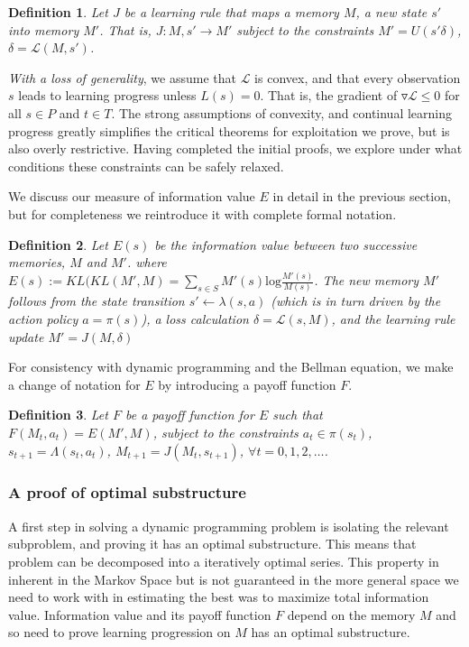 \documentclass[9pt,twocolumn,twoside]{pnas-new}
\newtheorem{definition}{Definition}
\begin{document}
\begin{definition}
    Let $J$ be a learning rule that maps a memory $M$, a new state $s'$ into memory $M'$. That is, $J : M, s' \rightarrow M'$ subject to the constraints  $M' = U(s' \delta)$, $\delta = \mathcal{L}(M, s')$.
\end{definition}

\textit{With a loss of generality}, we assume that $\mathcal{L}$ is convex, and that every observation $s$ leads to learning progress unless $L(s) = 0$. That is, the gradient of $\triangledown \mathcal{L} \leq 0$ for all $s \in P$ and $t \in T$. The strong assumptions of convexity, and continual learning progress greatly simplifies the critical theorems for exploitation we prove, but is also overly restrictive. Having completed the initial proofs, we explore under what conditions these constraints can be safely relaxed.

We discuss our measure of information value $E$ in detail in the previous section, but for completeness we reintroduce it with complete formal notation.

\begin{definition}
    Let $E(s)$ be the information value between two successive memories, $M$ and $M'$. where $E(s) := KL(KL(M', M) = \sum_{s \in S} M'(s) \text{log} \frac{M'(s)}{M(s)} $. The new memory $M'$ follows from the state transition $s' \leftarrow \lambda (s, a)$ (which is in turn driven by the action policy $a = \pi(s)$), a loss calculation $\delta = \mathcal{L}(s, M)$, and the learning rule update $M' = J(M, \delta)$
\end{definition}

For consistency with dynamic programming and the Bellman equation, we make a change of notation for $E$ by introducing a payoff function $F$.

\begin{definition}
    Let $F$ be a payoff function for $E$ such that $F(M_t, a_t) = E(M', M)$, subject to the constraints $a_t \in \pi(s_t)$, $s_{t+1} = \Lambda(s_t, a_t)$, $M_{t+1} = J(M_t, s_{t+1})$, $\forall t = 0,1,2,\ldots$.
\end{definition}

\subsubsection*{A proof of optimal substructure}
A first step in solving a dynamic programming problem is isolating the relevant subproblem, and proving it has an optimal substructure. This means that problem can be decomposed into a iteratively optimal series. This property in inherent in the Markov Space %
but is not guaranteed in the more general space we need to work with in estimating the best was to maximize total information value. Information value and its payoff function $F$ depend on the memory $M$ and so need to prove learning progression on $M$ has an optimal substructure.
\end{document}
